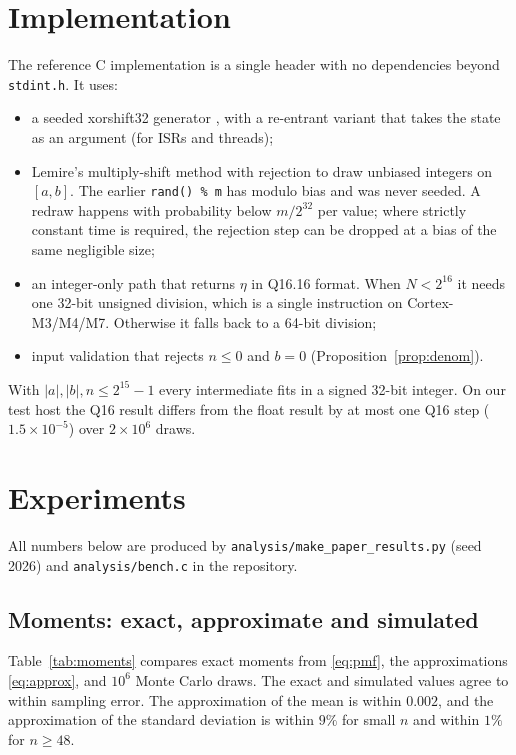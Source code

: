 \documentclass[10pt,a4paper]{article}
\theoremstyle{definition}
\theoremstyle{remark}
\begin{document}
\section{Implementation}\label{sec:impl}
The reference C implementation is a single header with no dependencies beyond
\texttt{stdint.h}. It uses:
\begin{itemize}
\item a seeded xorshift32 generator \cite{marsaglia}, with a re-entrant variant that takes
the state as an argument (for ISRs and threads);
\item Lemire's multiply-shift method with rejection \cite{lemire} to draw unbiased integers
on $[a,b]$. The earlier \texttt{rand() \% m} has modulo bias and was never seeded. A redraw
happens with probability below $m/2^{32}$ per value; where strictly constant time is required,
the rejection step can be dropped at a bias of the same negligible size;
\item an integer-only path that returns $\eta$ in Q16.16 format. When $N<2^{16}$ it needs one
32-bit unsigned division, which is a single instruction on Cortex-M3/M4/M7. Otherwise it
falls back to a 64-bit division;
\item input validation that rejects $n\le0$ and $b=0$ (Proposition~\ref{prop:denom}).
\end{itemize}
With $|a|,|b|,n\le 2^{15}-1$ every intermediate fits in a signed 32-bit integer. On our
test host the Q16 result differs from the float result by at most one Q16 step
($1.5\times10^{-5}$) over $2\times10^6$ draws.

\section{Experiments}\label{sec:exp}
All numbers below are produced by \texttt{analysis/make\_paper\_results.py} (seed 2026) and
\texttt{analysis/bench.c} in the repository.

\subsection{Moments: exact, approximate and simulated}
Table~\ref{tab:moments} compares exact moments from \eqref{eq:pmf}, the approximations
\eqref{eq:approx}, and $10^6$ Monte Carlo draws. The exact and simulated values agree to
within sampling error. The approximation of the mean is within $0.002$, and the
approximation of the standard deviation is within $9\%$ for small $n$ and within $1\%$ for
$n\ge48$.
\end{document}
